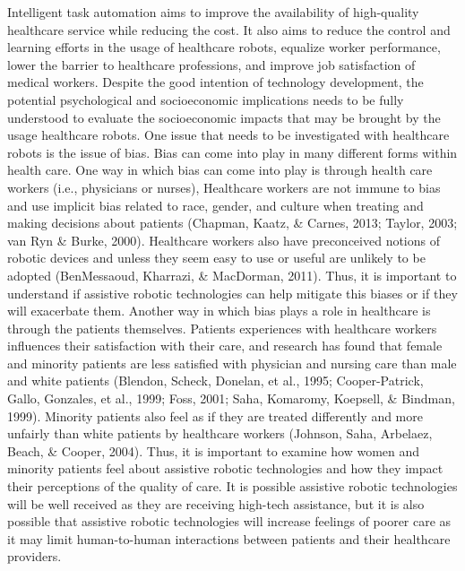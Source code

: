 Intelligent task automation aims to improve the availability of high-quality healthcare service while reducing the cost.  It also aims to reduce the control and learning efforts in the usage of healthcare robots, equalize worker performance, lower the barrier to healthcare professions, and improve job satisfaction of medical workers. Despite the good intention of technology development,  the potential psychological and socioeconomic implications needs to be fully understood to evaluate the socioeconomic impacts that may be brought by the usage healthcare robots. 
One issue that needs to be investigated with healthcare robots is the issue of bias.  Bias can come into play in many different forms within health care.  One way in which bias can come into play is through health care workers (i.e., physicians or nurses), Healthcare workers are not immune to bias and use implicit bias related to race, gender, and culture when treating and making decisions about patients (Chapman, Kaatz, \& Carnes, 2013; Taylor, 2003; van Ryn \& Burke, 2000).  Healthcare workers also have preconceived notions of robotic devices and unless they seem easy to use or useful are unlikely to be adopted (BenMessaoud, Kharrazi, \& MacDorman, 2011).  Thus, it is important to understand if assistive robotic technologies can help mitigate this biases or if they will exacerbate them.  
Another way in which bias plays a role in healthcare is through the patients themselves.  Patients experiences with healthcare workers influences their satisfaction with their care, and research has found that female and minority patients are less satisfied with physician and nursing care than male and white patients (Blendon, Scheck, Donelan, et al., 1995; Cooper-Patrick, Gallo, Gonzales, et al., 1999; Foss, 2001; Saha, Komaromy, Koepsell, \& Bindman, 1999).  Minority patients also feel as if they are treated differently and more unfairly than white patients by healthcare workers (Johnson, Saha, Arbelaez, Beach, \& Cooper, 2004).   Thus, it is important to examine how women and minority patients feel about assistive robotic technologies and how they impact their perceptions of the quality of care.  It is possible assistive robotic technologies will be well received as they are receiving high-tech assistance, but it is also possible that assistive robotic technologies will increase feelings of poorer care as it may limit human-to-human interactions between patients and their healthcare providers.  


